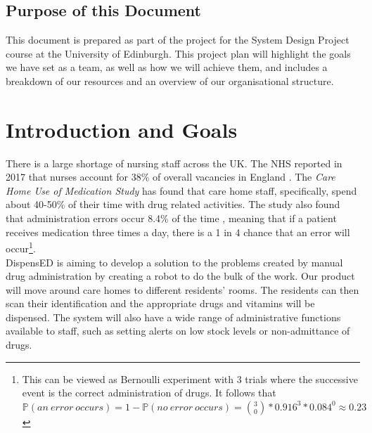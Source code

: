 \documentclass[a4paper,10pt,DIV10,openright,openbib]{scrreprt}
\begin{document}
\section*{Purpose of this Document}
This document is prepared as part of the project for the System Design Project course
at the University of Edinburgh. This project plan will highlight the goals we
have set as a team, as well as how we will achieve them, and includes a breakdown
of our resources and an overview of our organisational structure.
\vspace{2cm}
{\let\clearpage\relax  \chapter{Introduction and Goals}}

There is a large shortage of nursing staff across the UK. The NHS reported in 2017
that nurses account for 38\% of overall vacancies in England \cite{NHS}.
The \textit{Care Home Use of Medication Study} has found that care home staff, specifically, spend about 40-50\% of their time with drug
related activities. The study also found that administration errors occur
8.4\% of the time \cite{CHUMS}, meaning that if a patient receives medication
three times a day, there is a 1 in 4 chance that an error will
occur\footnote{This can be viewed as Bernoulli experiment with 3 trials where the successive
  event is the correct administration of drugs. It follows that
  $\mathbb{P}(an\ error\ occurs) = 1 - \mathbb{P}(no\ error\ occurs) =
  \binom{3}{0}*0.916^3*0.084^0 \approx 0.23$}. \\
DispensED is aiming to develop a solution to the problems created by manual drug
administration by creating a robot to do the bulk of the work. Our product will
move around care homes to different residents' rooms. The residents can then
scan their identification and the appropriate drugs and vitamins will be
dispensed. The system will also have a wide range of administrative functions
available to staff, such as setting alerts on low stock levels or non-admittance of drugs.
\end{document}

